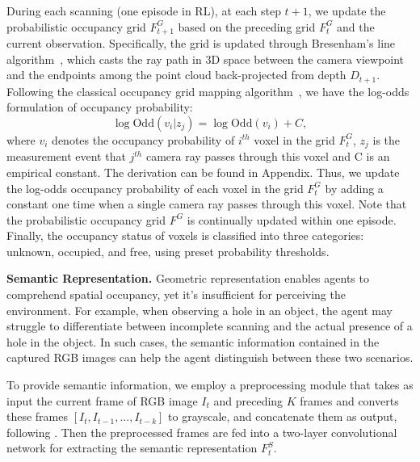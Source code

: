     During each scanning (one episode in RL), at each step $t+1$, we update the probabilistic occupancy grid $F_{t+1}^G$ based on the preceding grid $F_{t}^G$ and the current observation. Specifically, the grid is updated through Bresenham's line algorithm~\citep{bresenham1965algorithm}, which casts the ray path in 3D space between the camera viewpoint and the endpoints among the point cloud back-projected from depth $D_{t+1}$. Following the classical occupancy grid mapping algorithm~\citep{thrun2002probabilistic}, we have the log-odds formulation of occupancy probability:
        \begin{equation}
        \log \mathrm{Odd}(v_i|z_j) = \log \mathrm{Odd}(v_i) + C,
        \end{equation}
    where $v_i$ denotes the occupancy probability of $i^{th}$ voxel in the grid $F^G_t$, $z_j$ is the measurement event that $j^{th}$ camera ray passes through this voxel and C is an empirical constant. The derivation can be found in Appendix.
    Thus, we update the log-odds occupancy probability of each voxel in the grid $F^G_t$ by adding a constant one time when a single camera ray passes through this voxel. Note that the probabilistic occupancy grid $F^G$ is continually updated within one episode. Finally, the occupancy status of voxels is classified into three categories: unknown, occupied, and free, using preset probability thresholds.


    \vspace{1pt}
    \noindent\textbf{Semantic Representation.} 
    Geometric representation enables agents to comprehend spatial occupancy, yet it's insufficient for perceiving the environment. 
    For example, when observing a hole in an object, the agent may struggle to differentiate between incomplete scanning and the actual presence of a hole in the object. In such cases, the semantic information contained in the captured RGB images can help the agent distinguish between these two scenarios.
    
    To provide semantic information, we employ a preprocessing module that takes as input the current frame of RGB image $I_t$ and preceding $K$ frames and converts these frames $[I_t, I_{t-1}, ..., I_{t-k}]$ to grayscale, and concatenate them as output, following \cite{peralta2020next}. Then the preprocessed frames are fed into a two-layer convolutional network for extracting the semantic representation $F^S_t$. 


